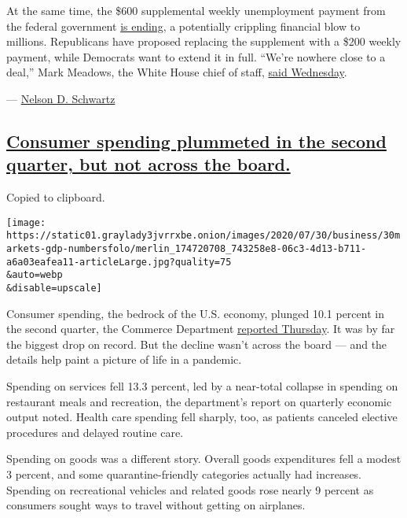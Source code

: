 At the same time, the \$600 supplemental weekly unemployment payment
from the federal government
\href{https://www.nytimes3xbfgragh.onion/2020/07/29/business/economy/unemployment-benefits-coronavirus.html}{is
ending}, a potentially crippling financial blow to millions. Republicans
have proposed replacing the supplement with a \$200 weekly payment,
while Democrats want to extend it in full. ``We're nowhere close to a
deal,'' Mark Meadows, the White House chief of staff,
\href{https://www.nytimes3xbfgragh.onion/2020/07/29/business/economy/virus-aid-trump.html}{said
Wednesday}.

---
\href{https://www.nytimes3xbfgragh.onion/by/nelson-d-schwartz}{Nelson D.
Schwartz}

\hypertarget{consumer-spending-plummeted-in-the-second-quarter-but-not-across-the-board}{%
\subsection{\texorpdfstring{\protect\hyperlink{consumer-spending-plummeted-in-the-second-quarter-but-not-across-the-board}{Consumer
spending plummeted in the second quarter, but not across the
board.}}{Consumer spending plummeted in the second quarter, but not across the board.}}\label{consumer-spending-plummeted-in-the-second-quarter-but-not-across-the-board}}

Copied to clipboard.

\texttt{[image: https://static01.graylady3jvrrxbe.onion/images/2020/07/30/business/30markets-gdp-numbersfolo/merlin\_174720708\_743258e8-06c3-4d13-b711-a6a03eafea11-articleLarge.jpg?quality=75\\\&auto=webp\\\&disable=upscale]}

Consumer spending, the bedrock of the U.S. economy, plunged 10.1 percent
in the second quarter, the Commerce Department
\href{https://www.bea.gov/sites/default/files/2020-07/gdp2q20_adv.pdf}{reported
Thursday}. It was by far the biggest drop on record. But the decline
wasn't across the board --- and the details help paint a picture of life
in a pandemic.

Spending on services fell 13.3 percent, led by a near-total collapse in
spending on restaurant meals and recreation, the department's report on
quarterly economic output noted. Health care spending fell sharply, too,
as patients canceled elective procedures and delayed routine care.

Spending on goods was a different story. Overall goods expenditures fell
a modest 3 percent, and some quarantine-friendly categories actually had
increases. Spending on recreational vehicles and related goods rose
nearly 9 percent as consumers sought ways to travel without getting on
airplanes.

